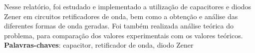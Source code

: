 \setlength{\absparsep}{18pt} %
 \begin{resumo}
Nesse relatório, foi estudado e implementado a utilização de capacitores e diodos Zener em circuitos retificadores de onda, bem como a obtenção e análise das diferentes formas de onda geradas. Foi também realizada análise teórica do problema, para comparação dos valores experimentais com os valores teóricos. \\
 \noindent
 \textbf{Palavras-chaves}: capacitor, retificador de onda, diodo Zener
\end{resumo} 